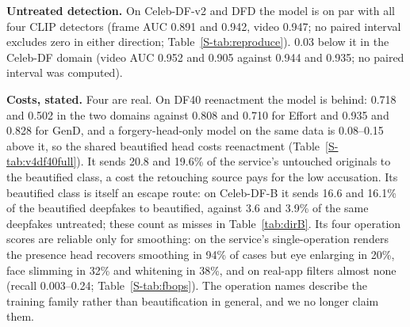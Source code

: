 \documentclass[conference]{IEEEtran}
\begin{document}
\textbf{Untreated detection.} On Celeb-DF-v2 and DFD the model is on par with all four CLIP detectors (frame AUC 0.891 and
0.942, video 0.947; no paired interval excludes zero in either direction; Table~\ref{S-tab:reproduce}).
0.03 below it in the Celeb-DF domain (video AUC 0.952 and 0.905 against 0.944 and 0.935; no paired interval was computed).

\textbf{Costs, stated.} Four are real. On DF40 reenactment the model is behind: 0.718 and 0.502 in the two domains against
0.808 and 0.710 for Effort and 0.935 and 0.828 for GenD, and a forgery-head-only model on the same data is 0.08--0.15 above
it, so the shared beautified head costs reenactment (Table~\ref{S-tab:v4df40full}).
It sends 20.8 and 19.6\% of the service's untouched originals to the beautified class,
a cost the retouching source pays for the low accusation. Its beautified class is itself an escape route: on Celeb-DF-B it
sends 16.6 and 16.1\% of the beautified deepfakes to beautified, against 3.6 and 3.9\% of the same deepfakes untreated; these
count as misses in Table~\ref{tab:dirB}.
Its four operation scores are reliable only for smoothing: on the
service's single-operation renders the presence head recovers smoothing in 94\% of cases but eye
enlarging in 20\%, face slimming in 32\% and whitening in 38\%,
and on real-app filters almost none (recall 0.003--0.24; Table~\ref{S-tab:fbops}).
The operation names describe the training family rather than beautification in general, and we no longer claim them.

\end{document}
